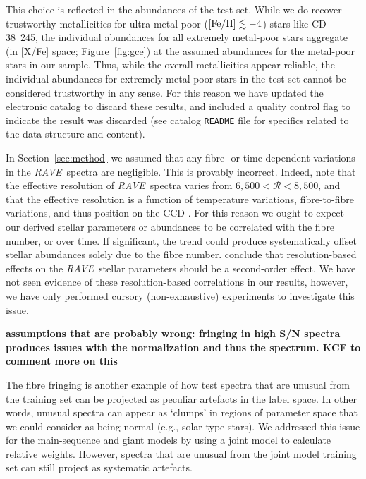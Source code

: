 \documentclass[preprint,trackchanges]{aastex}
\newcommand{\acronym}[1]{{\small{#1}}}
\newcommand{\project}[1]{\textsl{#1}}
\newcommand{\rave}{\project{\acronym{RAVE}}}
\newcommand{\stub}[1]{{\color{blue} \textbf{#1}}}
\begin{document}
This choice is reflected in the abundances of the test set.  While we do recover
trustworthy metallicities for ultra metal-poor ($[{\rm Fe/H}] \lesssim -4$) stars like 
CD-38~245, the individual abundances for all extremely metal-poor stars aggregate
(in [X/Fe] space; Figure~\ref{fig:gce}) at the assumed abundances for the metal-poor
stars in our sample.  Thus, while the overall metallicities appear reliable, the 
individual abundances for extremely metal-poor stars in the test set cannot be
considered trustworthy in any sense.  For this reason we have updated the electronic
catalog to discard these results, and included a quality control flag to indicate
the result was discarded (see catalog \texttt{README} file for specifics related to
the data structure and content).


In Section~\ref{sec:method} we assumed that any fibre- or time-dependent variations
in the \rave\ spectra are negligible.  This is provably incorrect. Indeed,
\citet{Kordopatis_2013} note that the effective resolution of \rave\
spectra varies from $6{,}500 < \mathcal{R} < 8{,}500$, and that the 
effective resolution is a function of temperature variations, fibre-to-fibre
variations, and thus position on the CCD \citep{Steinmetz_2006}.
 For this reason we ought to expect our derived stellar
parameters or abundances to be correlated with the fibre number, or over
time.  If significant, the trend could produce systematically offset
stellar abundances solely due to the fibre number.  \citet{Kordopatis_2013}
conclude that resolution-based effects on the \rave\ stellar parameters
should be a second-order effect. We have not seen evidence of these 
resolution-based correlations in our results, however, we have only
performed cursory (non-exhaustive) experiments to investigate this issue.


\stub{assumptions that are probably wrong: fringing in high S/N spectra produces issues with the normalization and thus the spectrum. KCF to comment more on this}


The fibre fringing is another example of how test spectra that are
unusual from the training set can be projected as peculiar artefacts in the
label space.  In other words, unusual spectra can appear as `clumps' in
regions of parameter space that we could consider as being normal 
(e.g., solar-type stars).  We addressed this issue for the main-sequence
and giant models by using a joint model to calculate relative weights.
However, spectra that are unusual from the joint model training set can
still project as systematic artefacts.  
\end{document}
